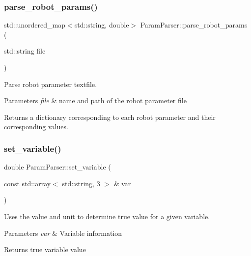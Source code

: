 \subsubsection{\texorpdfstring{parse\+\_\+robot\+\_\+params()}{parse\_robot\_params()}}
{\footnotesize\ttfamily std\+::unordered\+\_\+map$<$std\+::string, double$>$ Param\+Parser\+::parse\+\_\+robot\+\_\+params (\begin{DoxyParamCaption}\item[{std\+::string}]{file }\end{DoxyParamCaption})}



Parse robot parameter textfile. 


\begin{DoxyParams}{Parameters}
{\em file} & name and path of the robot parameter file \\
\hline
\end{DoxyParams}
\begin{DoxyReturn}{Returns}
a dictionary corresponding to each robot parameter and their corresponding values. 
\end{DoxyReturn}
\mbox{\label{class_param_parser_a2c0289b9e481c8aabd8f68a30d15d906}} 
\subsubsection{\texorpdfstring{set\+\_\+variable()}{set\_variable()}}
{\footnotesize\ttfamily double Param\+Parser\+::set\+\_\+variable (\begin{DoxyParamCaption}\item[{const std\+::array$<$ std\+::string, 3 $>$ \&}]{var }\end{DoxyParamCaption})}



Uses the value and unit to determine true value for a given variable. 


\begin{DoxyParams}{Parameters}
{\em var} & Variable information \\
\hline
\end{DoxyParams}
\begin{DoxyReturn}{Returns}
true variable value 
\end{DoxyReturn}
\mbox{\label{class_param_parser_a4a57d55f9ccfa1e728763fd6ddc844f3}} 
